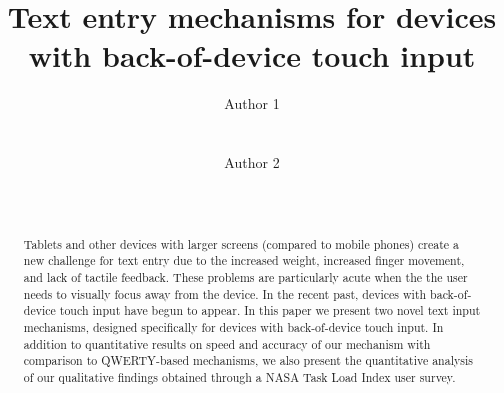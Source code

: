\documentclass{chi2011}
\begin{document}
\setlength{\paperheight}{11in}
\setlength{\paperwidth}{8.5in}
\setlength{\pdfpageheight}{\paperheight}
\setlength{\pdfpagewidth}{\paperwidth}


\title{Text entry mechanisms for devices with back-of-device touch input}
\author{
  \alignauthor Author 1\\
    \\
    \\
  \alignauthor Author 2\\
    \\
    \\
}

\maketitle

\begin{abstract}
  Tablets and other devices with larger screens (compared to mobile phones) create a new challenge for text entry due to the increased weight, increased finger movement,
  and lack of tactile feedback.  These problems are particularly acute
  when the the user needs to visually focus away from the device. In the recent past, devices with back-of-device touch input have begun to appear.  In this paper we present two novel text input mechanisms, designed specifically for
  devices with back-of-device touch input.  In addition to quantitative
  results on speed and accuracy of our mechanism with comparison to
  QWERTY-based mechanisms, we also present the quantitative analysis
  of our qualitative findings obtained through a NASA Task Load Index
  user survey.
\end{abstract}







%


\end{document}

